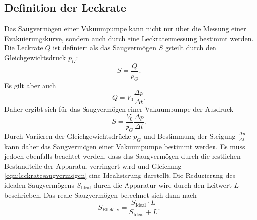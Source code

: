 \subsection{Definition der Leckrate}
\label{subsec:leckratetheorie}
Das Saugvermögen einer Vakuumpumpe kann nicht nur über die Messung einer Evakuierungskurve, sondern auch
durch eine Leckratenmessung bestimmt werden. Die Leckrate $Q$ ist definiert als das Saugvermögen $S$ geteilt durch
den Gleichgewichtsdruck $p_{G}$:
\begin{equation}
 S = \frac{Q}{p_{G}}.
\end{equation}
Es gilt aber auch
\begin{equation}
 Q = V_{0} \frac{\Delta p}{\Delta t}.
\end{equation}
Daher ergibt sich für das Saugvermögen einer Vakuumpumpe der Ausdruck
\begin{equation}
 S = \frac{V_{0}}{p_{G}} \frac{\Delta p}{\Delta t}.
 \label{eqn:leckratesaugvermögen}
\end{equation}
Durch Variieren der Gleichgewichtsdrücke $p_{G}$ und Bestimmung der Steigung $\frac{\Delta p}{\Delta t}$
kann daher das Saugvermögen einer Vakuumpumpe bestimmt werden. Es muss jedoch ebenfalls beachtet
werden, dass das Saugvermögen durch die restlichen Bestandteile der Apparatur verringert wird und
Gleichung \ref{eqn:leckratesaugvermögen} eine Idealisierung darstellt. Die Reduzierung des idealen
Saugvermögens $S_{\text{Ideal}}$ durch die Apparatur wird durch den Leitwert $L$ beschrieben. Das reale Saugvermögen
berechnet sich dann nach
\begin{equation}
 S_{\text{Effektiv}} = \frac{S_{\text{Ideal}} \cdot L}{S_{\text{Ideal}} + L}.
 \label{eqn:saugvermögenleitwert}
\end{equation}


